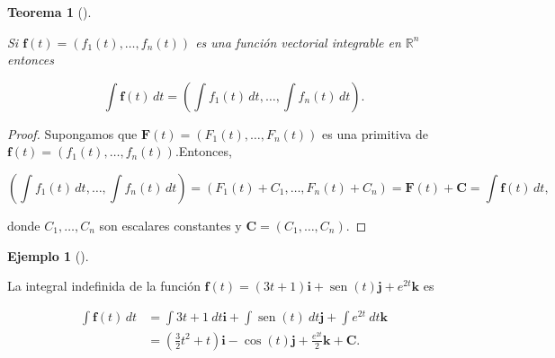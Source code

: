 \documentclass[
  a4paper,
]{scrreport}
\theoremstyle{definition}
\newtheorem{example}{Ejemplo}[chapter]
\theoremstyle{plain}
\theoremstyle{definition}
\theoremstyle{definition}
\theoremstyle{plain}
\newtheorem{theorem}{Teorema}[chapter]
\theoremstyle{plain}
\theoremstyle{remark}
\begin{document}
\begin{theorem}[]\protect\hypertarget{thm-integral-indefinida-funcion-vectorial}{}\label{thm-integral-indefinida-funcion-vectorial}

Si \(\mathbf{f}(t)=(f_1(t), \ldots, f_n(t))\) es una función vectorial
integrable en \(\mathbb{R}^n\) entonces

\[
\int \mathbf{f}(t)\, dt = \left(\int f_1(t)\, dt, \ldots, \int f_n(t)\,dt\right).
\]

\end{theorem}

\begin{tcolorbox}[enhanced jigsaw, leftrule=.75mm, colbacktitle=quarto-callout-note-color!10!white, toprule=.15mm, opacityback=0, opacitybacktitle=0.6, toptitle=1mm, breakable, bottomtitle=1mm, colframe=quarto-callout-note-color-frame, rightrule=.15mm, titlerule=0mm, title=\textcolor{quarto-callout-note-color}{\faInfo}\hspace{0.5em}{Demostración}, arc=.35mm, left=2mm, bottomrule=.15mm, colback=white, coltitle=black]

\begin{proof}
Supongamos que \(\mathbf{F}(t)=(F_1(t),\ldots,F_n(t))\) es una primitiva
de \(\mathbf{f}(t)=(f_1(t), \ldots, f_n(t))\).Entonces,

\[
\left(\int f_1(t)\, dt, \ldots, \int f_n(t)\,dt\right) 
= (F_1(t)+C_1,\ldots, F_n(t)+C_n)
= \mathbf{F}(t)+\mathbf{C} = \int \mathbf{f}(t)\, dt,
\]

donde \(C_1,\ldots,C_n\) son escalares constantes y
\(\mathbf{C}=(C_1,\ldots, C_n)\).
\end{proof}

\end{tcolorbox}

\begin{example}[]\protect\hypertarget{exm-integral-indefinida-funcion-vectorial}{}\label{exm-integral-indefinida-funcion-vectorial}

La integral indefinida de la función
\(\mathbf{f}(t) = (3t+1) \mathbf{i} + \operatorname{sen}(t) \mathbf{j} + e^{2t} \mathbf{k}\)
es

\begin{align*}
\int \mathbf{f}(t)\, dt
&= \int 3t+1\ dt \mathbf{i} + \int \operatorname{sen}(t)\ dt \mathbf{j} + \int e^{2t}\ dt \mathbf{k} \\
&= \left(\frac{3}{2}t^2+t\right) \mathbf{i} - \cos(t) \mathbf{j} + \frac{e^{2t}}{2} \mathbf{k} + \mathbf{C}.
\end{align*}

\end{example}
\end{document}
